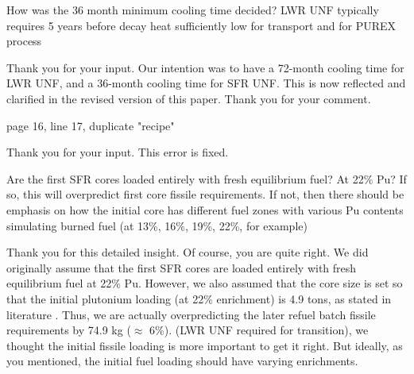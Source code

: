 \documentclass[answers,11pt]{exam}
\begin{document}
\begin{questions}
        \question How was the 36 month minimum cooling time decided? LWR UNF 
        typically requires 5 years before decay heat sufficiently low for 
        transport and for PUREX process

        \begin{solution}
                Thank you for your input. Our intention was to have a 72-month
                cooling time for LWR UNF, and a 36-month cooling time for SFR UNF.
                This is now reflected and clarified in the revised version of
                this paper. Thank you for your comment.
        \end{solution}

        \question page 16, line 17, duplicate "recipe"
        \begin{solution}
                Thank you for your input. This error is fixed.
        \end{solution}

        \question Are the first SFR cores loaded entirely with fresh 
        equilibrium fuel? At 22\% Pu?  If so, this will overpredict first core 
        fissile requirements. If not, then there should be emphasis on how the 
        initial core has different fuel zones with various Pu contents 
        simulating burned fuel (at 13\%, 16\%, 19\%, 22\%, for example)

        \begin{solution}
                Thank you for this detailed insight. Of course, you are quite right. 
                We did originally assume
                that the first SFR cores are loaded entirely with
                fresh equilibrium fuel at 22\% Pu. However, we also assumed
                that the core size is set so that the initial plutonium
                loading (at 22\% enrichment) is 4.9 tons, as stated in
                literature \cite{chenaud_status_2013}. Thus, we are
                actually overpredicting the later refuel batch fissile
                requirements by 74.9 kg ($\approx$ 6\%). 
                (LWR UNF required for transition), we thought the 
                initial fissile loading is more important to get it right.
                But ideally, as you mentioned, the initial fuel loading
                should have varying enrichments.       
        \end{solution}



\end{questions}
\end{document}
